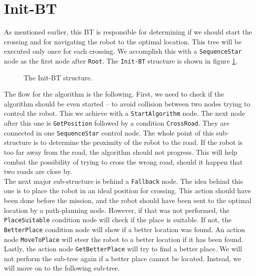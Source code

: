 \section{Init-BT}
    As mentioned earlier, this BT is responsible for determining if we should start the crossing and for navigating the robot to the optimal location. This tree will be executed only once for each crossing. We accomplish this with a \texttt{SequenceStar} node as the first node after \texttt{Root}. The \texttt{Init-BT} structure is shown in figure \ref{fig:Init-BT}.
    \begin{figure}[H]
        \caption{The Init-BT structure.}
        \label{fig:Init-BT}
    \end{figure}
    \noindent The flow for the algorithm is the following. First, we need to check if the algorithm should be even started -- to avoid collision between two nodes trying to control the robot. This we achieve with a \texttt{StartAlgorithm} node. The next node after this one is \texttt{GetPosition} followed by a condition \texttt{CrossRoad}. They are connected in one \texttt{SequenceStar} control node. The whole point of this sub-structure is to determine the proximity of the robot to the road. If the robot is too far away from the road, the algorithm should not progress. This will help combat the possibility of trying to cross the wrong road, should it happen that two roads are close by.\\
    The next major sub-structure is behind a \texttt{Fallback} node. The idea behind this one is to place the robot in an ideal position for crossing. This action should have been done before the mission, and the robot should have been sent to the optimal location by a path-planning node. However, if that was not performed, the \texttt{PlaceSuitable} condition node will check if the place is suitable. If not, the \texttt{BetterPlace} condition node will show if a better location was found. An action node \texttt{MoveToPlace} will steer the robot to a better location if it has been found. Lastly, the action node \texttt{GetBetterPlace} will try to find a better place. We will not perform the sub-tree again if a better place cannot be located. Instead, we will move on to the following sub-tree.

